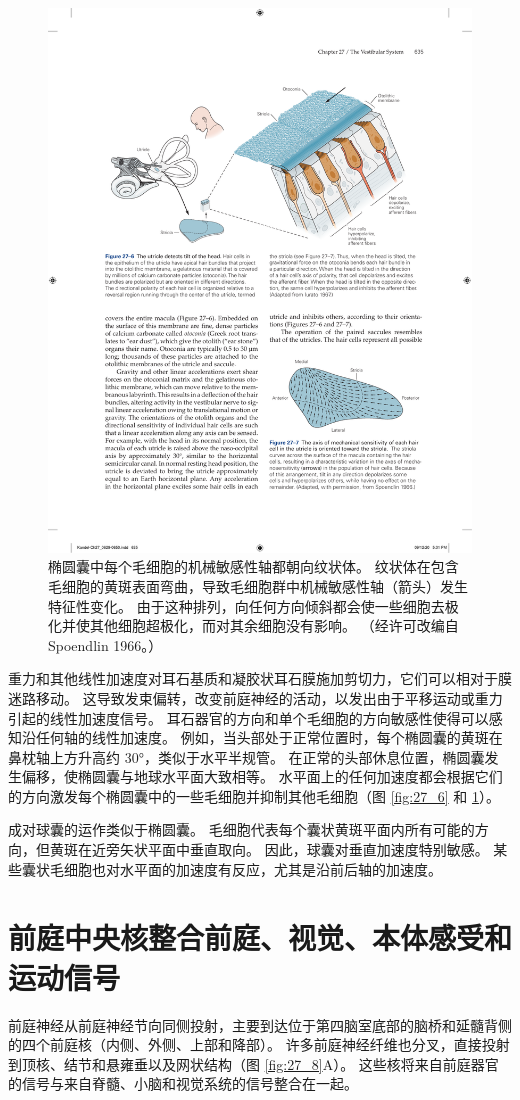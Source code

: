 \begin{figure}[htbp]
	\centering
	\includegraphics[width=0.5\linewidth]{chap27/fig_27_7}
	\caption{椭圆囊中每个毛细胞的机械敏感性轴都朝向纹状体。 纹状体在包含毛细胞的黄斑表面弯曲，导致毛细胞群中机械敏感性轴（箭头）发生特征性变化。 由于这种排列，向任何方向倾斜都会使一些细胞去极化并使其他细胞超极化，而对其余细胞没有影响。 （经许可改编自 Spoendlin 1966。）}
	\label{fig:27_7}
\end{figure}


重力和其他线性加速度对耳石基质和凝胶状耳石膜施加剪切力，它们可以相对于膜迷路移动。
这导致发束偏转，改变前庭神经的活动，以发出由于平移运动或重力引起的线性加速度信号。
耳石器官的方向和单个毛细胞的方向敏感性使得可以感知沿任何轴的线性加速度。
例如，当头部处于正常位置时，每个椭圆囊的黄斑在鼻枕轴上方升高约 30°，类似于水平半规管。
在正常的头部休息位置，椭圆囊发生偏移，使椭圆囊与地球水平面大致相等。
水平面上的任何加速度都会根据它们的方向激发每个椭圆囊中的一些毛细胞并抑制其他毛细胞（图 \ref{fig:27_6} 和 \ref{fig:27_7}）。


成对球囊的运作类似于椭圆囊。
毛细胞代表每个囊状黄斑平面内所有可能的方向，但黄斑在近旁矢状平面中垂直取向。
因此，球囊对垂直加速度特别敏感。
某些囊状毛细胞也对水平面的加速度有反应，尤其是沿前后轴的加速度。



\section{前庭中央核整合前庭、视觉、本体感受和运动信号}

前庭神经从前庭神经节向同侧投射，主要到达位于第四脑室底部的脑桥和延髓背侧的四个前庭核（内侧、外侧、上部和降部）。
许多前庭神经纤维也分叉，直接投射到顶核、结节和悬雍垂以及网状结构（图 \ref{fig:27_8}A）。 
这些核将来自前庭器官的信号与来自脊髓、小脑和视觉系统的信号整合在一起。


